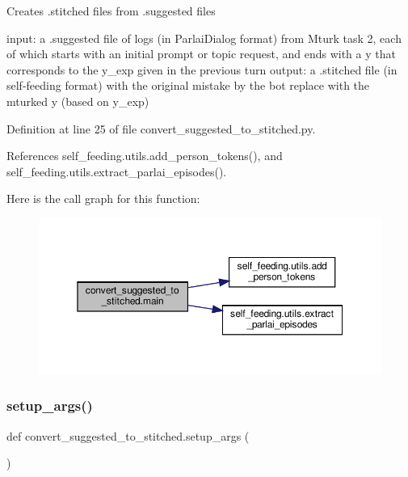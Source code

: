\begin{DoxyVerb}Creates .stitched files from .suggested files

input: a .suggested file of logs (in ParlaiDialog format) from Mturk task 2, each of
    which starts with an initial prompt or topic request, and ends with a y
    that corresponds to the y_exp given in the previous turn
output: a .stitched file (in self-feeding format) with the original mistake by the
    bot replace with the mturked y (based on y_exp)
\end{DoxyVerb}
 

Definition at line 25 of file convert\+\_\+suggested\+\_\+to\+\_\+stitched.\+py.



References self\+\_\+feeding.\+utils.\+add\+\_\+person\+\_\+tokens(), and self\+\_\+feeding.\+utils.\+extract\+\_\+parlai\+\_\+episodes().

Here is the call graph for this function\+:
\nopagebreak
\begin{figure}[H]
\begin{center}
\leavevmode
\includegraphics[width=350pt]{namespaceconvert__suggested__to__stitched_ac3bf979d2e88b310cde10ac1eac0406a_cgraph}
\end{center}
\end{figure}
\mbox{\label{namespaceconvert__suggested__to__stitched_a6d40b7687a1f943f799a2b537ebecce4}} 
\subsubsection{\texorpdfstring{setup\+\_\+args()}{setup\_args()}}
{\footnotesize\ttfamily def convert\+\_\+suggested\+\_\+to\+\_\+stitched.\+setup\+\_\+args (\begin{DoxyParamCaption}{ }\end{DoxyParamCaption})}



